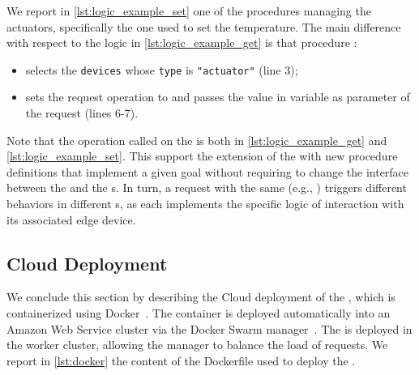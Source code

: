 We report in \cref{lst:logic_example_set} one of the procedures managing
the actuators, specifically the one used to set the temperature. The main
difference with respect to the logic in \cref{lst:logic_example_get} is that
procedure :

\begin{itemize}
  \item selects the \lstinline{devices} whose {\small \texttt{type}} is
  \lstinline{"actuator"} (line 3);
  \item sets the request operation to  and passes the value
  in variable  as parameter of the request
  (lines 6-7).
\end{itemize}

Note that the operation called on the  is 
both in \cref{lst:logic_example_get} and \cref{lst:logic_example_set}. This
support the extension of the  with new procedure definitions
that implement a given goal without requiring to change the interface between
the  and the s. In turn, a request with the same
 (e.g., ) triggers different
behaviors in different s, as each implements the specific logic
of interaction with its associated edge device.
%


\subsection{Cloud Deployment}

We conclude this section by describing the Cloud deployment of the
, which is containerized using
Docker~\cite{Merkel:2014:DLL:2600239.2600241}. The container is deployed
automatically into an Amazon Web Service cluster via the Docker Swarm
manager~\cite{Soppelsa:2017:NDC:3153103}. The  is deployed in
the worker cluster, allowing the manager to balance the load of requests. We
report in \cref{lst:docker} the content of the Dockerfile used to deploy the .
%

